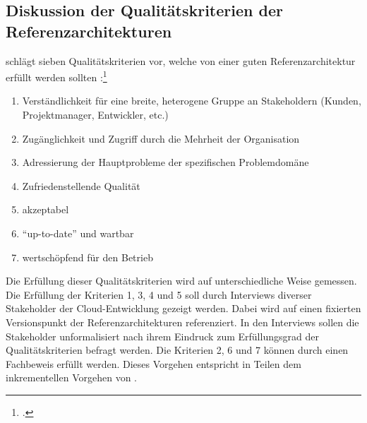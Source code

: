 \subsection{Diskussion der Qualitätskriterien der Referenzarchitekturen}\label{chap:qualitycriteria}
\citeauthor{Muller.2020} schlägt sieben Qualitätskriterien vor, welche von einer guten Referenzarchitektur erfüllt werden sollten :\footcite[Vgl. auch im Folgenden][8]{Muller.2020}
\begin{enumerate}
\item Verständlichkeit für eine breite, heterogene Gruppe an Stakeholdern (Kunden, Projektmanager, Entwickler, etc.) 
\item Zugänglichkeit und Zugriff durch die Mehrheit der Organisation 
\item Adressierung der Hauptprobleme der spezifischen Problemdomäne 
\item Zufriedenstellende Qualität 
\item akzeptabel 
\item \enquote{up-to-date} und wartbar 
\item wertschöpfend für den Betrieb 
\end{enumerate}
Die Erfüllung dieser Qualitätskriterien wird auf unterschiedliche Weise gemessen. Die Erfüllung der Kriterien 1, 3, 4 und 5 soll durch Interviews diverser Stakeholder der Cloud-Entwicklung gezeigt werden. Dabei wird auf einen fixierten Versionspunkt der Referenzarchitekturen referenziert. In den Interviews sollen die Stakeholder unformalisiert nach ihrem Eindruck zum Erfüllungsgrad der Qualitätskriterien befragt werden. Die Kriterien 2, 6 und 7 können durch einen Fachbeweis erfüllt werden. Dieses Vorgehen entspricht in Teilen dem inkrementellen Vorgehen von \citeauthor{Muller.2020}.


